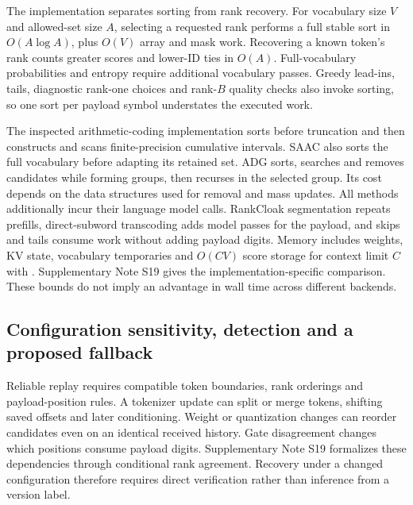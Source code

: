 \documentclass[fleqn,10pt]{wlscirep}
\DeclareRobustCommand{\code}[1]{{\normalfont\path{#1}}}
\begin{document}
The implementation separates sorting from rank recovery. For vocabulary size \(V\) and allowed-set size \(A\), selecting a requested rank performs a full stable sort in \(O(A\log A)\), plus \(O(V)\) array and mask work. Recovering a known token's rank counts greater scores and lower-ID ties in \(O(A)\). Full-vocabulary probabilities and entropy require additional vocabulary passes. Greedy lead-ins, tails, diagnostic rank-one choices and rank-\(B\) quality checks also invoke sorting, so one sort per payload symbol understates the executed work.

The inspected arithmetic-coding implementation sorts before truncation and then constructs and scans finite-precision cumulative intervals\cite{Ziegler2019NeuralLinguisticSteganography}. SAAC also sorts the full vocabulary before adapting its retained set\cite{Shen2020SelfAdjustingArithmetic}. ADG sorts, searches and removes candidates while forming groups, then recurses in the selected group\cite{Zhang2021ProvablySecureGenerative}. Its cost depends on the data structures used for removal and mass updates. All methods additionally incur their language model calls. RankCloak segmentation repeats prefills, direct-subword transcoding adds model passes for the payload, and skips and tails consume work without adding payload digits. Memory includes weights, KV state, vocabulary temporaries and \(O(CV)\) score storage for context limit \(C\) with \code{logits_all=True}. Supplementary Note S19 gives the implementation-specific comparison. These bounds do not imply an advantage in wall time across different backends.


\subsection*{Configuration sensitivity, detection and a proposed fallback}\label{sec:v4-boundaries}
Reliable replay requires compatible token boundaries, rank orderings and payload-position rules. A tokenizer update can split or merge tokens, shifting saved offsets and later conditioning. Weight or quantization changes can reorder candidates even on an identical received history. Gate disagreement changes which positions consume payload digits. Supplementary Note S19 formalizes these dependencies through conditional rank agreement. Recovery under a changed configuration therefore requires direct verification rather than inference from a version label.
\end{document}
